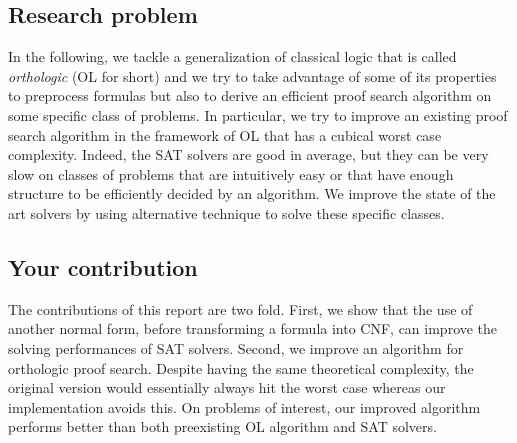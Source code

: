 \documentclass[a4paper, 11pt]{article}
\begin{document}

	\subsection*{Research problem}
	In the following, we tackle a generalization of classical logic that is called 
	\textit{orthologic} (OL for short) and we try to take advantage of
	some of its properties to preprocess formulas but also to derive an efficient proof search 
	algorithm on some specific class of problems. In particular, we try to improve an existing 
	proof search algorithm in the framework of OL
	that has a cubical worst case complexity. Indeed, the SAT solvers are good in average, but they 
	can be very slow on classes of
	problems that are intuitively easy or that have enough structure to be efficiently decided by an
	algorithm. We improve the state of the art solvers by using alternative technique to solve these
	specific classes. 


	\subsection*{Your contribution}
	The contributions of this report are two fold. First, we show that the use of another normal
	form, before transforming a formula into CNF, can improve the solving performances of SAT 
	solvers.
	Second, we improve an algorithm for orthologic proof search. Despite having the same
	theoretical complexity, the original version would essentially always hit the worst case whereas
	our implementation avoids this. On problems of interest, our improved algorithm performs better 
	than both preexisting OL algorithm and SAT solvers.
\end{document}
